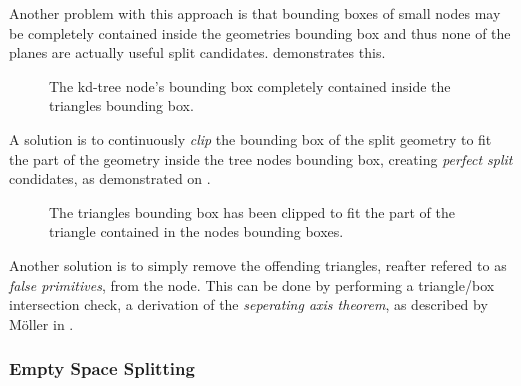 Another problem with this approach is that bounding boxes of small
nodes may be completely contained inside the geometries bounding box
and thus none of the planes are actually useful split
candidates.  demonstrates this.

\begin{figure}
  \centering
  \caption[A tree node's bounding box contained in a triangle bouding
    box.]{The kd-tree node's bounding box completely contained inside
    the triangles bounding box.}
  \label{fig:aabbContained}
\end{figure}

A solution is to continuously \textit{clip} the bounding box of the
split geometry to fit the part of the geometry inside the tree nodes
bounding box, creating \textit{perfect split} condidates, as
demonstrated on .

\begin{figure}
  \centering
  \caption[Triangle clipping.]{The triangles bounding box has been
    clipped to fit the part of the triangle contained in the nodes
    bounding boxes.}
  \label{fig:aabbClipped}
\end{figure}

Another solution is to simply remove the offending triangles, reafter
refered to as \textit{false primitives}, from the node. This can be
done by performing a triangle/box intersection check, a derivation of
the \textit{seperating axis theorem}, as described by Möller in
.


\subsubsection{Empty Space Splitting}

